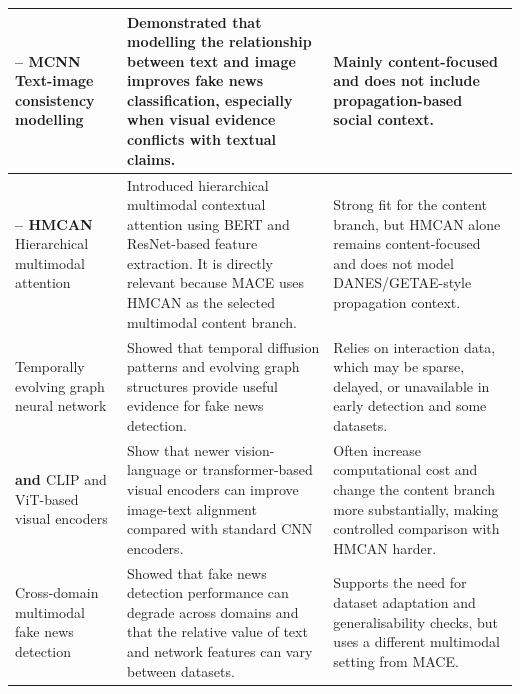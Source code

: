 {\begin{longtable}{
>{\raggedright\arraybackslash}p{}
>{\raggedright\arraybackslash}p{}
>{\raggedright\arraybackslash}p{}
}
\midrule

\textbf{\citet{Xue2021} -- MCNN} \newline
Text-image consistency modelling
&
Demonstrated that modelling the relationship between text and image improves fake news classification, especially when visual evidence conflicts with textual claims.
&
Mainly content-focused and does not include propagation-based social context. \\

\midrule

\textbf{\citet{Qian2021} -- HMCAN} \newline
Hierarchical multimodal attention
&
Introduced hierarchical multimodal contextual attention using BERT and ResNet-based feature extraction. It is directly relevant because MACE uses HMCAN as the selected multimodal content branch.
&
Strong fit for the content branch, but HMCAN alone remains content-focused and does not model DANES/GETAE-style propagation context. \\

\midrule

\textbf{\citet{Song2021}} \newline
Temporally evolving graph neural network
&
Showed that temporal diffusion patterns and evolving graph structures provide useful evidence for fake news detection.
&
Relies on interaction data, which may be sparse, delayed, or unavailable in early detection and some datasets. \\

\midrule

\textbf{\citet{Radford2021} and \citet{Dosovitskiy2021}} \newline
CLIP and ViT-based visual encoders
&
Show that newer vision-language or transformer-based visual encoders can improve image-text alignment compared with standard CNN encoders.
&
Often increase computational cost and change the content branch more substantially, making controlled comparison with HMCAN harder. \\

\midrule

\textbf{\citet{silva2021embracing}} \newline
Cross-domain multimodal fake news detection
&
Showed that fake news detection performance can degrade across domains and that the relative value of text and network features can vary between datasets.
&
Supports the need for dataset adaptation and generalisability checks, but uses a different multimodal setting from MACE. \\


\end{longtable}}
